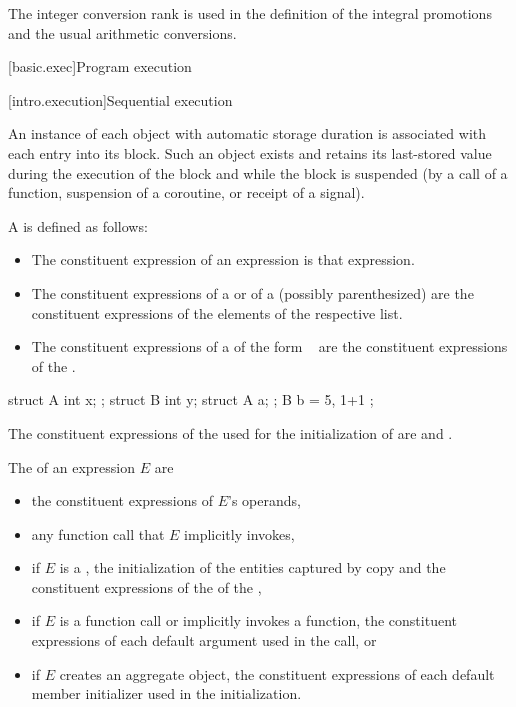 \begin{note}
The integer conversion rank is used in the definition of the integral
promotions and the usual arithmetic
conversions.
\end{note}

[basic.exec]{Program execution}

[intro.execution]{Sequential execution}

\pnum
An instance of each object with automatic storage
duration is associated with each entry into its
block. Such an object exists and retains its last-stored value during
the execution of the block and while the block is suspended (by a call
of a function, suspension of a coroutine, or receipt of a signal).

\pnum
A  is defined as follows:
\begin{itemize}
\item
The constituent expression of an expression is that expression.
\item
The constituent expressions of a  or
of a (possibly parenthesized) 
are the constituent expressions of the elements of the respective list.
\item
The constituent expressions of a 
of the form \tcode{=}~
are the constituent expressions of the .
\end{itemize}
\begin{example}
\begin{codeblock}
struct A { int x; };
struct B { int y; struct A a; };
B b = { 5, { 1+1 } };
\end{codeblock}
The constituent expressions of the 
used for the initialization of  are  and .
\end{example}

\pnum
The  of an expression $E$ are
\begin{itemize}
\item
the constituent expressions of $E$'s operands,
\item
any function call that $E$ implicitly invokes,
\item
if $E$ is a ,
the initialization of the entities captured by copy and
the constituent expressions of the  of the ,
\item
if $E$ is a function call or implicitly invokes a function,
the constituent expressions of each default argument
used in the call, or
\item
if $E$ creates an aggregate object,
the constituent expressions of each default member initializer
used in the initialization.
\end{itemize}

